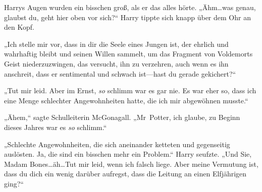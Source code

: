Harrys Augen wurden ein bisschen groß, als er das alles hörte.
„Ähm…was genau, glaubst du, geht hier oben vor sich?“
Harry tippte sich knapp über dem Ohr an den Kopf.

„Ich stelle mir vor, dass in dir die Seele eines Jungen ist, der ehrlich und wahrhaftig bleibt und seinen Willen sammelt, um das Fragment von Voldemorts Geist niederzuzwingen, das versucht, ihn zu verzehren, auch wenn es ihn anschreit, dass er sentimental und schwach ist—hast du gerade gekichert?“

„Tut mir leid. Aber im Ernst, \emph{so} schlimm war es gar nie. Es war eher so, dass ich eine Menge schlechter Angewohnheiten hatte, die ich mir abgewöhnen musste.“

„Ähem,“ sagte Schulleiterin McGonagall. „Mr~Potter, ich glaube, zu Beginn dieses Jahres war es \emph{so} schlimm.“

„Schlechte Angewohnheiten, die sich aneinander ketteten und gegenseitig auslösten. Ja, die sind ein bisschen mehr ein Problem.“
Harry seufzte.
„Und Sie, Madam Bones…äh…Tut mir leid, wenn ich falsch liege. Aber meine Vermutung ist, dass du dich ein wenig darüber aufregst, dass die Leitung an einen Elfjährigen ging?“

